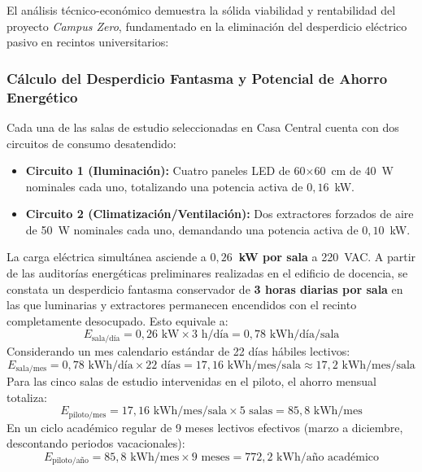 El análisis técnico-económico demuestra la sólida viabilidad y rentabilidad del proyecto \textit{Campus Zero}, fundamentado en la eliminación del desperdicio eléctrico pasivo en recintos universitarios:

\subsubsection{Cálculo del Desperdicio Fantasma y Potencial de Ahorro Energético}
Cada una de las salas de estudio seleccionadas en Casa Central cuenta con dos circuitos de consumo desatendido:
\begin{itemize}
    \item \textbf{Circuito 1 (Iluminación):} Cuatro paneles LED de 60$\times$60~cm de 40~W nominales cada uno, totalizando una potencia activa de $0{,}16$~kW.
    \item \textbf{Circuito 2 (Climatización/Ventilación):} Dos extractores forzados de aire de 50~W nominales cada uno, demandando una potencia activa de $0{,}10$~kW.
\end{itemize}
La carga eléctrica simultánea asciende a \textbf{$0{,}26$~kW por sala} a 220~VAC. A partir de las auditorías energéticas preliminares realizadas en el edificio de docencia, se constata un desperdicio fantasma conservador de \textbf{3 horas diarias por sala} en las que luminarias y extractores permanecen encendidos con el recinto completamente desocupado. Esto equivale a:
\begin{equation}
    E_{\text{sala/día}} = 0{,}26\text{ kW} \times 3\text{ h/día} = 0{,}78\text{ kWh/día/sala}
\end{equation}
Considerando un mes calendario estándar de 22 días hábiles lectivos:
\begin{equation}
    E_{\text{sala/mes}} = 0{,}78\text{ kWh/día} \times 22\text{ días} = 17{,}16\text{ kWh/mes/sala} \approx 17{,}2\text{ kWh/mes/sala}
\end{equation}
Para las cinco salas de estudio intervenidas en el piloto, el ahorro mensual totaliza:
\begin{equation}
    E_{\text{piloto/mes}} = 17{,}16\text{ kWh/mes/sala} \times 5\text{ salas} = 85{,}8\text{ kWh/mes}
\end{equation}
En un ciclo académico regular de 9 meses lectivos efectivos (marzo a diciembre, descontando periodos vacacionales):
\begin{equation}
    E_{\text{piloto/año}} = 85{,}8\text{ kWh/mes} \times 9\text{ meses} = 772{,}2\text{ kWh/año académico}
\end{equation}

